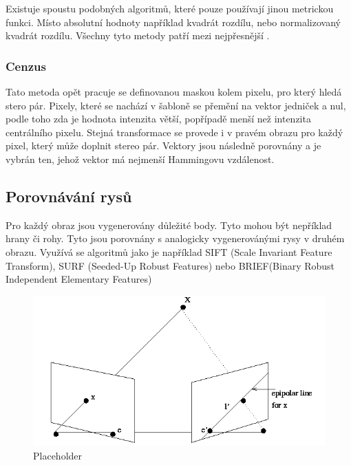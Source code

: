 \documentclass[twoside]{ctuthesis}
\begin{document}
Existuje spoustu podobných algoritmů, které pouze používají jinou metrickou funkci. Místo absolutní hodnoty například kvadrát rozdílu, nebo normalizovaný kvadrát rozdílu. Všechny tyto metody patří mezi nejpřesnější \cite{kuhl2005comparison}. 

\subsubsection{Cenzus}
\label{Sec:cenzus}
Tato metoda opět pracuje se definovanou maskou kolem pixelu, pro který hledá stero pár. Pixely, které se nachází v šabloně se přemění na vektor jedniček a nul, podle toho zda je hodnota intenzita větší, popřípadě menší než intenzita centrálního pixelu. Stejná transformace se provede i v pravém obrazu pro každý pixel, který může doplnit stereo pár. Vektory jsou následně porovnány a je vybrán ten, jehož vektor má nejmenší Hammingovu vzdálenost.

\subsection{Porovnávání rysů}
Pro každý obraz jsou vygenerovány důležité body. Tyto mohou být nepříklad hrany či rohy. Tyto jsou porovnány s analogicky vygenerovánými rysy v druhém obrazu. Využívá se algoritmů jako je například SIFT (Scale Invariant Feature Transform), SURF (Seeded-Up Robust Features) nebo BRIEF(Binary Robust Independent Elementary Features)

\begin{figure}
    \centering
    \includegraphics[width = 0.8\linewidth]{pictures/epipolar.png}
    \caption{Placeholder}
    \label{fig:epipolar}
\end{figure}




\end{document}
